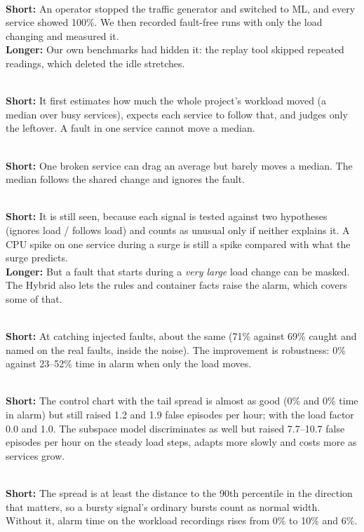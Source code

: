 \\
\textbf{Short:} An operator stopped the traffic generator and switched to ML, and every service showed 100\%. We then recorded fault-free runs with only the load changing and measured it.\\
\textbf{Longer:} Our own benchmarks had hidden it: the replay tool skipped repeated readings, which deleted the idle stretches.

\\
\textbf{Short:} It first estimates how much the whole project's workload moved (a median over busy services), expects each service to follow that, and judges only the leftover. A fault in one service cannot move a median.

\\
\textbf{Short:} One broken service can drag an average but barely moves a median. The median follows the shared change and ignores the fault.

\\
\textbf{Short:} It is still seen, because each signal is tested against two hypotheses (ignores load / follows load) and counts as unusual only if neither explains it. A CPU spike on one service during a surge is still a spike compared with what the surge predicts.\\
\textbf{Longer:} But a fault that starts during a \emph{very large} load change can be masked. The Hybrid also lets the rules and container facts raise the alarm, which covers some of that.

\\
\textbf{Short:} At catching injected faults, about the same (71\% against 69\% caught and named on the real faults, inside the noise). The improvement is robustness: 0\% against 23--52\% time in alarm when only the load moves.

\\
\textbf{Short:} The control chart with the tail spread is almost as good (0\% and 0\% time in alarm) but still raised 1.2 and 1.9 false episodes per hour; with the load factor 0.0 and 1.0. The subspace model discriminates as well but raised 7.7--10.7 false episodes per hour on the steady load steps, adapts more slowly and costs more as services grow.

\\
\textbf{Short:} The spread is at least the distance to the 90th percentile in the direction that matters, so a bursty signal's ordinary bursts count as normal width. Without it, alarm time on the workload recordings rises from 0\% to 10\% and 6\%.

